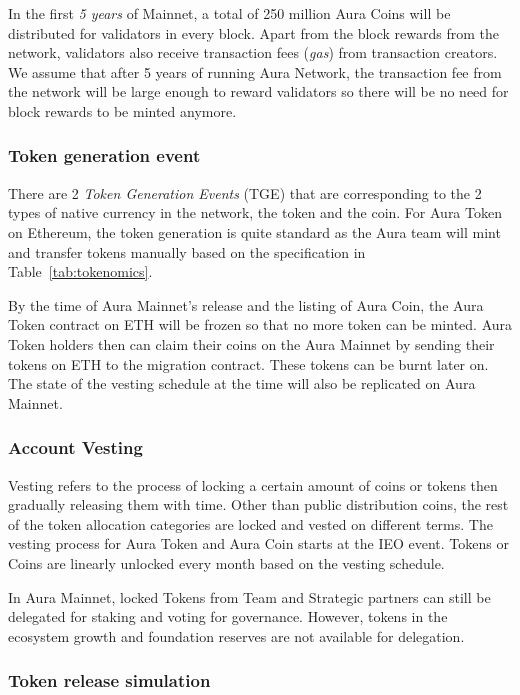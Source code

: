 \documentclass[11pt, titlepage]{article}
\begin{document}
In the first \emph{5 years} of Mainnet, a total of 250 million Aura Coins will be distributed for validators in every block. Apart from the block rewards from the network, validators also receive transaction fees (\emph{gas}) from transaction creators. We assume that after 5 years of running Aura Network, the transaction fee from the network will be large enough to reward validators so there will be no need for block rewards to be minted anymore.

\subsubsection{Token generation event}
There are 2 \emph{Token Generation Events} (TGE) that are corresponding to the 2 types of native currency in the network, the token and the coin. For Aura Token on Ethereum, the token generation is quite standard as the Aura team will mint and transfer tokens manually based on the specification in Table~\ref{tab:tokenomics}.

By the time of Aura Mainnet's release and the listing of Aura Coin, the Aura Token contract on ETH will be frozen so that no more token can be minted. Aura Token holders then can claim their coins on the Aura Mainnet by sending their tokens on ETH to the migration contract. These tokens can be burnt later on. The state of the vesting schedule at the time will also be replicated on Aura Mainnet. 

\subsubsection{Account Vesting}
Vesting refers to the process of locking a certain amount of coins or tokens then gradually releasing them with time. Other than public distribution coins, the rest of the token allocation categories are locked and vested on different terms. The vesting process for Aura Token and Aura Coin starts at the IEO event. Tokens or Coins are linearly unlocked every month based on the vesting schedule. 

In Aura Mainnet, locked Tokens from Team and Strategic partners can still be delegated for staking and voting for governance. However, tokens in the ecosystem growth and foundation reserves are not available for delegation. 

\subsubsection{Token release simulation}
\end{document}
